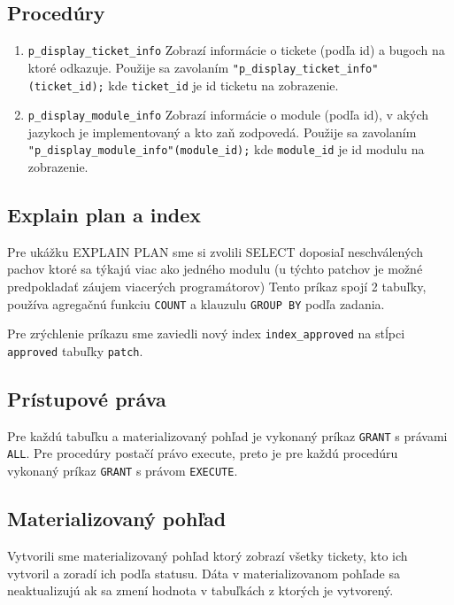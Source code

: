\documentclass[11pt, a4paper]{article}
\begin{document}
    \subsection{Procedúry}\label{subsec:procedúry}

    \begin{enumerate}
        \item \texttt{p\_display\_ticket\_info}
        Zobrazí informácie o tickete (podľa id) a bugoch na ktoré odkazuje.
        Použije sa zavolaním \texttt{"p\_display\_ticket\_info"(ticket\_id);} kde \texttt{ticket\_id} je id ticketu na zobrazenie.

        \item \texttt{p\_display\_module\_info}
        Zobrazí informácie o module (podľa id), v akých jazykoch je implementovaný a kto zaň zodpovedá.
        Použije sa zavolaním \texttt{"p\_display\_module\_info"(module\_id);} kde \texttt{module\_id} je id modulu na zobrazenie.
    \end{enumerate}

    \subsection{Explain plan a index}\label{subsec:explain-plan-+-index}

    Pre ukážku EXPLAIN PLAN sme si zvolili SELECT doposiaľ neschválených pachov ktoré sa týkajú viac ako jedného modulu (u týchto patchov je možné predpokladať záujem viacerých programátorov)
    Tento príkaz spojí 2 tabuľky, používa agregačnú funkciu \texttt{COUNT} a klauzulu \texttt{GROUP BY} podľa zadania.

    Pre zrýchlenie príkazu sme zaviedli nový index \texttt{index\_approved} na stĺpci \texttt{approved} tabuľky \texttt{patch}.

    \subsection{Prístupové práva}\label{subsec:prístupové-práva}

    Pre každú tabuľku a materializovaný pohľad je vykonaný príkaz \texttt{GRANT} s právami \texttt{ALL}.
    Pre procedúry postačí právo execute, preto je pre každú procedúru vykonaný príkaz \texttt{GRANT} s právom \texttt{EXECUTE}.

    \subsection{Materializovaný pohľad}\label{subsec:materializovaný-pohľad}

    Vytvorili sme materializovaný pohľad ktorý zobrazí všetky tickety, kto ich vytvoril a zoradí ich podľa statusu.
    Dáta v materializovanom pohľade sa neaktualizujú ak sa zmení hodnota v tabuľkách z ktorých je vytvorený.
\end{document}
